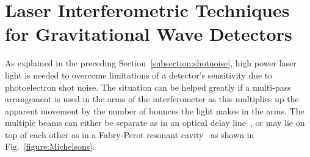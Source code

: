 \documentclass{article}
\begin{document}
\newpage

\section{Laser Interferometric Techniques for Gravitational Wave Detectors}
\label{section:interferometry}

As explained in the preceding Section~\ref{subsection:shotnoise},
high power laser light is needed to overcome limitations of a
detector's sensitivity due to photoelectron shot noise. The situation
can be helped greatly if a multi-pass arrangement is used in the arms
of the interferometer as this multiplies up the apparent movement by
the number of bounces the light makes in the arms. The multiple beams
can either be separate as in an optical delay line~\cite{Weiss,
  Billing}, or may lie on top of each other as in a Fabry-Perot
resonant cavity~\cite{Drever2} as shown in
Fig.~\ref{figure:Michelsons}.
\end{document}
